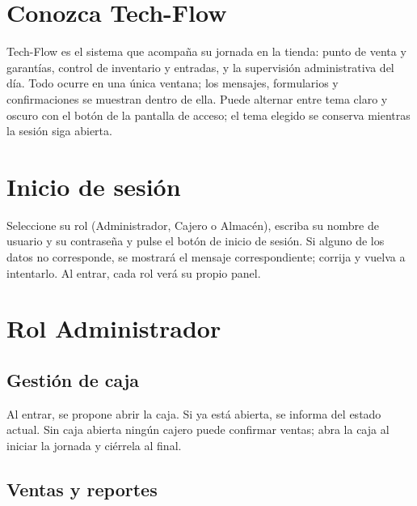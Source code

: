 \documentclass[12pt,a4paper]{report}
\begin{document}
\tableofcontents\clearpage

\section{Conozca Tech-Flow}
Tech-Flow es el sistema que acompaña su jornada en la tienda: punto de venta y garantías, control de inventario y entradas, y la supervisión administrativa del día. Todo ocurre en una única ventana; los mensajes, formularios y confirmaciones se muestran dentro de ella. Puede alternar entre tema claro y oscuro con el botón de la pantalla de acceso; el tema elegido se conserva mientras la sesión siga abierta.

\section{Inicio de sesión}

Seleccione su rol (Administrador, Cajero o Almacén), escriba su nombre de usuario y su contraseña y pulse el botón de inicio de sesión. Si alguno de los datos no corresponde, se mostrará el mensaje correspondiente; corrija y vuelva a intentarlo. Al entrar, cada rol verá su propio panel.

\section{Rol Administrador}

\subsection{Gestión de caja}

Al entrar, se propone abrir la caja. Si ya está abierta, se informa del estado actual. Sin caja abierta ningún cajero puede confirmar ventas; abra la caja al iniciar la jornada y ciérrela al final.

\subsection{Ventas y reportes}
\end{document}
